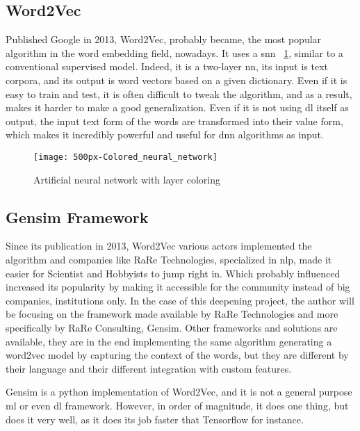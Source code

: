 \subsection{Word2Vec}
Published Google in 2013, Word2Vec\cite{article:word2vec}, probably became, the most popular algorithm in the word embedding field, nowadays. It uses a \gls{snn} ~\ref{fig:wikipedia_colored_neural_network_img}, similar to a conventional supervised model. Indeed, it is a two-layer \gls{nn}, its input is text corpora, and its output is word vectors based on a given dictionary. Even if it is easy to train and test, it is often difficult to tweak the algorithm, and as a result, makes it harder to make a good generalization. Even if it is not using \gls{dl} itself as output, the input text form of the words are transformed into their value form, which makes it incredibly powerful and useful for \gls{dnn} algorithms as input.

\begin{figure}[ht!]
    \centering
    \texttt{[image: 500px-Colored\_neural\_network]}
    \caption{
       Artificial neural network with layer coloring \cite{wikipedia:colored_neural_network_img}
    }
    \label{fig:wikipedia_colored_neural_network_img}
\end{figure}


\subsection{Gensim Framework}
Since its publication in 2013, Word2Vec\cite{article:word2vec} various actors implemented the algorithm and companies like RaRe Technologies\cite{company:rare-technologies}, specialized in \gls{nlp}, made it easier for Scientist and Hobbyists to jump right in. Which probably influenced increased its popularity by making it accessible for the community instead of big companies, institutions only. In the case of this deepening project, the author will be focusing on the framework made available by RaRe Technologies and more specifically by RaRe Consulting\cite{company:rare-consulting}, Gensim\cite{article:rehurek_lrec}. Other frameworks and solutions are available, they are in the end implementing the same algorithm generating a word2vec model by capturing the context of the words, but they are different by their language and their different integration with custom features.

Gensim is a python implementation of Word2Vec, and it is not a general purpose \gls{ml} or even \gls{dl} framework. However, in order of magnitude, it does one thing, but does it very well, as it does its job faster that Tensorflow\cite{article:tensorflow2015-whitepaper} for instance.

